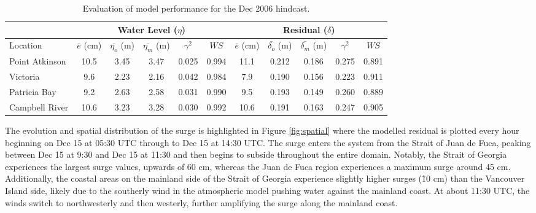\documentclass[pdftex,10pt]{article}
\begin{document}
\begin{table}[h]
\centering 
\begin{tabular}{|l |c c c c c | c c c c c|} 
\hline 
& \multicolumn{5}{|c|}{Water Level ($\eta$)}        & \multicolumn{5}{|c|}{Residual ($\delta$)} \\ 
\hline 
Location       & $\bar{e}$ (cm) & $\bar{\eta_{o}}$ (m) & $\bar{\eta_{m}}$ (m) & $\gamma^2$ & $WS$   & $\bar{e}$ (cm) & $\bar{\delta_{o}}$ (m) & $\bar{\delta_{m}}$ (m) & $\gamma^2$ & $WS$ \\
\hline 
Point Atkinson & 10.5           &  3.45                & 3.47                 &   0.025    & 0.994  & 11.1           &  0.212                 & 0.186                  &  0.275     & 0.891 \\
Victoria       &  9.6           &  2.23                & 2.16                 &   0.042    & 0.984  &  7.9           &  0.190                 & 0.156                  &  0.223     & 0.911 \\
Patricia Bay   &  9.2           &  2.63                & 2.58                 &   0.031    & 0.990  &  9.5           &  0.193                 & 0.149                  &  0.260     & 0.889 \\
Campbell River & 10.6           &  3.23                & 3.28                 &   0.030    & 0.992  & 10.6           &  0.191                 & 0.163                  &  0.247     & 0.905 \\
\hline 
\end{tabular}
\caption{Evaluation of model performance for the Dec 2006 hindcast.}
\label{tab:dec2006stat} 
\end{table}

The evolution and spatial distribution of the surge is highlighted in Figure \ref{fig:spatial} where the modelled residual is plotted every hour beginning on Dec 15 at 05:30 UTC through to Dec 15 at 14:30 UTC. The surge enters the system from the Strait of Juan de Fuca, peaking between Dec 15 at 9:30 and Dec 15 at 11:30 and then begins to subside throughout the entire domain. Notably, the Strait of Georgia experiences the largest surge values, upwards of 60 cm, whereas the Juan de Fuca region experiences a maximum surge around 45 cm. Additionally, the coastal areas on the mainland side of the Strait of Georgia experience slightly higher surges (\~ 10 cm) than the Vancouver Island side, likely due to the southerly wind in the atmospheric model pushing water against the mainland coast. At about 11:30 UTC, the winds switch to northwesterly and then westerly, further amplifying the surge along the mainland coast. 
\end{document}

